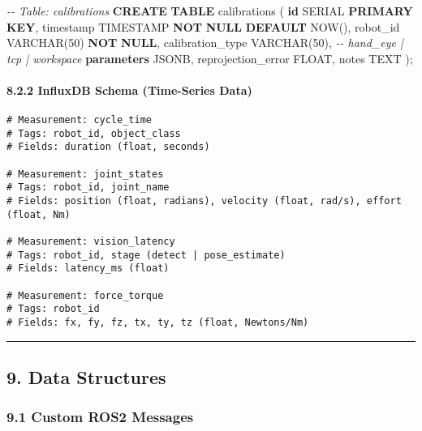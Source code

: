 \documentclass[
]{article}
\newenvironment{Shaded}{\begin{snugshade}}{\end{snugshade}}
\newcommand{\CommentTok}[1]{\textcolor[rgb]{0.56,0.35,0.01}{\textit{#1}}}
\newcommand{\DataTypeTok}[1]{\textcolor[rgb]{0.13,0.29,0.53}{#1}}
\newcommand{\DecValTok}[1]{\textcolor[rgb]{0.00,0.00,0.81}{#1}}
\newcommand{\KeywordTok}[1]{\textcolor[rgb]{0.13,0.29,0.53}{\textbf{#1}}}
\newcommand{\NormalTok}[1]{#1}
\begin{document}
\begin{Shaded}
\begin{Highlighting}[]
\CommentTok{{-}{-} Table: calibrations}
\KeywordTok{CREATE} \KeywordTok{TABLE}\NormalTok{ calibrations (}
    \KeywordTok{id}\NormalTok{ SERIAL }\KeywordTok{PRIMARY} \KeywordTok{KEY}\NormalTok{,}
    \DataTypeTok{timestamp} \DataTypeTok{TIMESTAMP} \KeywordTok{NOT} \KeywordTok{NULL} \KeywordTok{DEFAULT}\NormalTok{ NOW(),}
\NormalTok{    robot\_id }\DataTypeTok{VARCHAR}\NormalTok{(}\DecValTok{50}\NormalTok{) }\KeywordTok{NOT} \KeywordTok{NULL}\NormalTok{,}
\NormalTok{    calibration\_type }\DataTypeTok{VARCHAR}\NormalTok{(}\DecValTok{50}\NormalTok{),  }\CommentTok{{-}{-} \textquotesingle{}hand\_eye\textquotesingle{} | \textquotesingle{}tcp\textquotesingle{} | \textquotesingle{}workspace\textquotesingle{}}
    \KeywordTok{parameters}\NormalTok{ JSONB,}
\NormalTok{    reprojection\_error }\DataTypeTok{FLOAT}\NormalTok{,}
\NormalTok{    notes TEXT}
\NormalTok{);}
\end{Highlighting}
\end{Shaded}

\hypertarget{influxdb-schema-time-series-data}{%
\paragraph{8.2.2 InfluxDB Schema (Time-Series
Data)}\label{influxdb-schema-time-series-data}}

\begin{verbatim}
# Measurement: cycle_time
# Tags: robot_id, object_class
# Fields: duration (float, seconds)

# Measurement: joint_states
# Tags: robot_id, joint_name
# Fields: position (float, radians), velocity (float, rad/s), effort (float, Nm)

# Measurement: vision_latency
# Tags: robot_id, stage (detect | pose_estimate)
# Fields: latency_ms (float)

# Measurement: force_torque
# Tags: robot_id
# Fields: fx, fy, fz, tx, ty, tz (float, Newtons/Nm)
\end{verbatim}

\begin{center}\rule{0.5\linewidth}{0.5pt}\end{center}

\hypertarget{data-structures}{%
\subsection{9. Data Structures}\label{data-structures}}

\hypertarget{custom-ros2-messages}{%
\subsubsection{9.1 Custom ROS2 Messages}\label{custom-ros2-messages}}
\end{document}
